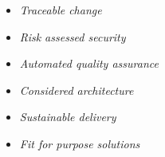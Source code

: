 \documentclass[a5paper,pagesize,10pt,bibtotoc,DIV=10,twoside]{scrbook}
\begin{document}
\begin{itemize}

\item \textit{Traceable change}

\item \textit{Risk assessed security}

\item \textit{Automated quality assurance}

\item \textit{Considered architecture}

\item \textit{Sustainable delivery}

\item \textit{Fit for purpose solutions}
\end{itemize}



\end{document}
